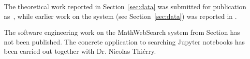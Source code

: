 The theoretical work reported in Section~\ref{sec:data} was submitted for publication as~\cite{CarFarKohRab:bmobb19}, while earlier work on the \dmh system (see Section~\ref{sec:data}) was reported in \cite{BerKohRab:tumdi19}.

The software engineering work on the MathWebSearch system from Section has not been published. The concrete application to searching Jupyter notebooks has been carried out together with Dr. Nicolas Thi\'erry.


